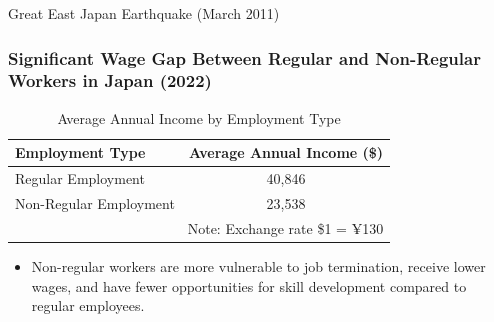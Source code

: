 \documentclass[serif, aspectratio=169]{beamer}
\newcommand{\gendergaplinks}{%
    \vfill %
    \hfill %
    {\small %
        \hyperlink{gendergapindex}{\beamerbutton{Reference}} \,

    }
}
\begin{document}
\begin{frame}{Great East Japan Earthquake (March 2011)}
\begin{minipage}{1.00\textwidth}
\begin{flushleft}
\begin{table}[h!]
  \vspace{-1.95cm} %
\end{table}
\end{flushleft}
    \end{minipage}
    
\end{frame}


\begin{frame}[label=gender_income_gap]
\frametitle{Significant Wage Gap Between Regular and Non-Regular Workers in Japan (2022)}
\begin{table}[ht]
\centering
\begin{tabular}{lc}
\toprule
Employment Type & Average Annual Income (\$) \\
\midrule
Regular Employment & 40,846 \\
Non-Regular Employment & 23,538 \\
\bottomrule
\multicolumn{2}{r}{\footnotesize Note: Exchange rate \$1 = ¥130} \\
\end{tabular}
\caption{Average Annual Income by Employment Type}
\label{tab:average_income}
\end{table}
\begin{itemize}
\item Non-regular workers are more vulnerable to job termination, receive lower wages, and have fewer opportunities for skill development compared to regular employees.
\end{itemize}
\gendergaplinks
\end{frame}

\end{document}
